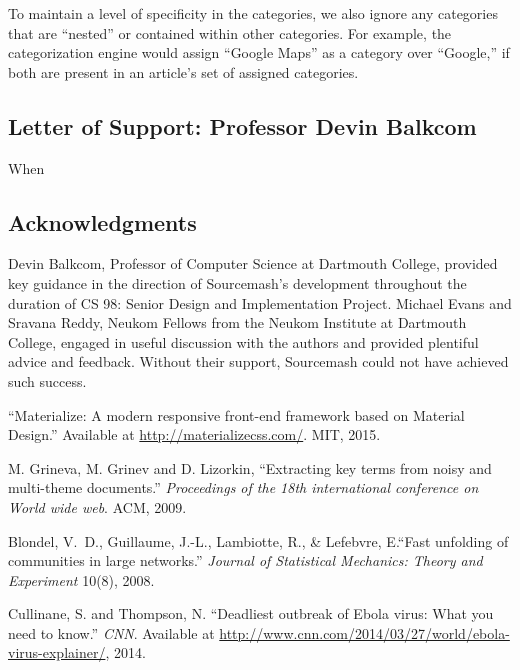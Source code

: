 \documentclass[11pt]{article}
\begin{document}
To maintain a level of specificity in the categories, we also ignore any categories that are ``nested'' or contained within other categories. For example, the categorization engine would assign ``Google Maps'' as a category over ``Google,'' if both are present in an article's set of assigned categories.


\subsection{Letter of Support: Professor Devin Balkcom}

When



\subsection*{Acknowledgments}
Devin Balkcom, Professor of Computer Science at Dartmouth College, provided key guidance in the direction of Sourcemash's development throughout the duration of CS 98: Senior Design and Implementation Project. Michael Evans and Sravana Reddy, Neukom Fellows from the Neukom Institute at Dartmouth College, engaged in useful discussion with the authors and provided plentiful advice and feedback. Without their support, Sourcemash could not have achieved such success.


\begin{thebibliography}{99}

  ``Materialize: A modern responsive front-end framework based on Material Design.'' Available at \url{http://materializecss.com/}. MIT, 2015.

  M. Grineva, M. Grinev and D. Lizorkin, ``Extracting key terms from noisy and multi-theme documents.'' \emph{Proceedings of the 18th international conference on World wide web}. ACM, 2009.

 Blondel, V.~D., Guillaume, J.-L., Lambiotte, R., \& Lefebvre, E.``Fast unfolding of communities in large networks.'' \emph{Journal of Statistical Mechanics: Theory and Experiment} 10(8), 2008.

 Cullinane, S. and Thompson, N. ``Deadliest outbreak of Ebola virus: What you need to know.'' \emph{CNN}. Available at \url{http://www.cnn.com/2014/03/27/world/ebola-virus-explainer/}, 2014.

\end{thebibliography}
\end{document}
